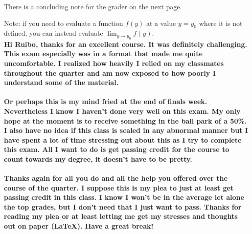 \documentclass[10pt]{amsart}
\begin{document}
\noindent
There is a concluding note for the grader on the next page.

Note: if you need to evaluate a function $f(y)$ at a value $y=y_0$ where it is not defined, you can instead evaluate $\lim_{y\to y_0} f(y)$. \\

\noindent
\textbf{Hi Ruibo, thanks for an excellent course. It was definitely challenging. This exam especially was in a format that made me quite uncomfortable. I realized how heavily I relied on my classmates throughout the quarter and am now exposed to how poorly I understand some of the material. \\ \\ \noindent Or perhaps this is my mind fried at the end of finals week. Nevertheless I know I haven't done very well on this exam. My only hope at the moment is to receive something in the ball park of a 50\%. I also have no idea if this class is scaled in any abnormal manner but I have spent a lot of time stressing out about this as I try to complete this exam. All I want to do is get passing credit for the course to count towards my degree, it doesn't have to be pretty. \\ \\ \noindent Thanks again for all you do and all the help you offered over the course of the quarter. I suppose this is my plea to just at least get passing credit in this class. I know I won't be in the average let alone the top grades, but I don't need that I just want to pass. Thanks for reading my plea or at least letting me get my stresses and thoughts out on paper (LaTeX). Have a great break!}
\end{document}
